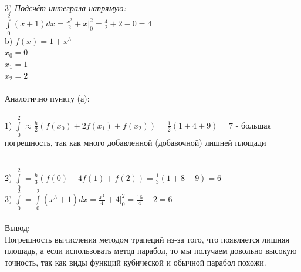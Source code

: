 \documentclass{article}
\begin{document}
3) \large\textit{Подсчёт интеграла напрямую:}\\
\normalsize
$ \int\limits^2_0 (x + 1)dx = \frac{x^2}{2} + x |^2_0 = \frac{4}{2} + 2 - 0 = 4 $\\
\newpage
\Large b) $ f(x) = 1 + x^3 $\\
\normalsize
$ x_0 = 0 $\\
$ x_1 = 1 $\\
$ x_2 = 2 $\\\\
Аналогично пункту (а):\\\\
1) $ \int\limits^2_0 \approx \frac{h}{2} (f(x_0) + 2f(x_1) + f(x_2)) = \frac{1}{2} (1+4+9) = 7 $ - большая погрешность, так как много добавленной (добавочной) лишней площади\\
\begin{figure}[h!]
\end{figure}
\\
2) $ \int\limits^2_0 = \frac{h}{3} (f(0) + 4f(1) + f(2)) = \frac{1}{3} (1+8+9) = 6 $\\
3) $ \int\limits^2_0 = \int\limits^2_0 (x^3 + 1)dx = \frac{x^4}{4} + 4 |^2_0 = \frac{16}{4} + 2 = 6 $\\\\
Вывод:\\
Погрешность вычисления методом трапеций из-за того, что появляется лишняя площадь, а если использовать метод парабол, то мы получаем довольно высокую точность, так как виды функций кубической и обычной парабол похожи.
\end{document}
